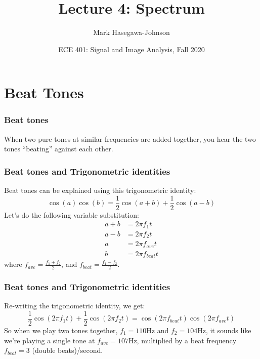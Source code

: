 \documentclass{beamer}
\title{Lecture 4: Spectrum}
\author{Mark Hasegawa-Johnson}
\date{ECE 401: Signal and Image Analysis, Fall 2020}
\begin{document}
\begin{frame}
  \maketitle
\end{frame}

\begin{frame}
  \tableofcontents
\end{frame}

\section[Beating]{Beat Tones}
\setcounter{subsection}{1}

\begin{frame}
  \frametitle{Beat tones}

  When two pure tones at similar frequencies are added together, you hear the  two tones
  ``beating'' against each other.
  \vspace*{1cm}
  \centerline{}
\end{frame}

\begin{frame}
  \frametitle{Beat tones and Trigonometric identities}

  Beat tones can be explained using this trigonometric identity:
  \[
  \cos(a)\cos(b)=\frac{1}{2}\cos(a+b)+\frac{1}{2}\cos(a-b)
  \]
  Let's do the following variable substitution:
  \begin{align*}
    a+b &= 2\pi f_1 t\\
    a-b &= 2\pi f_2 t\\
    a &= 2\pi f_{ave}t\\
    b &= 2\pi f_{beat}t
  \end{align*}
  where $f_{ave}=\frac{f_1+f_2}{2}$, and $f_{beat}=\frac{f_1-f_2}{2}$.
\end{frame}

\begin{frame}
  \frametitle{Beat tones and Trigonometric identities}

  Re-writing the trigonometric identity, we get:
  \[
  \frac{1}{2}\cos(2\pi f_1t)+\frac{1}{2}\cos(2\pi f_2 t) = \cos(2\pi f_{beat}t)\cos(2\pi f_{ave}t)
  \]
  So when we play two tones together, $f_1=110$Hz and $f_2=104$Hz, it
  sounds like we're playing a single tone at $f_{ave}=107$Hz,
  multiplied by a beat frequency $f_{beat}=3$ (double beats)/second.
\end{frame}
\end{document}
